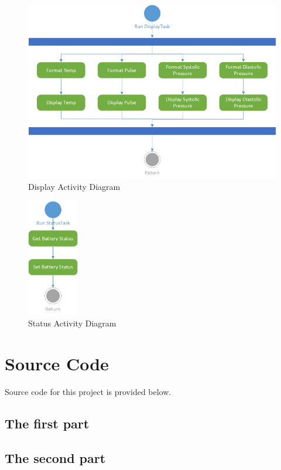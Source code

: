 \documentclass[12pt]{article} %
\begin{document}
\begin{figure}
  \centering
  \includegraphics[width=\textwidth]{../design/display_activity.png}
  \caption{Display Activity Diagram}
  \label{fig:Display}
\end{figure}

\begin{figure}
  \centering
  \includegraphics[width=0.2\textwidth]{../design/Status_activity.png}
  \caption{Status Activity Diagram}
  \label{fig:status}
\end{figure}

\section{Source Code}

Source code for this project is provided below.

\subsection{The first part}
% 

\subsection{The second part}
% 
\end{document}
